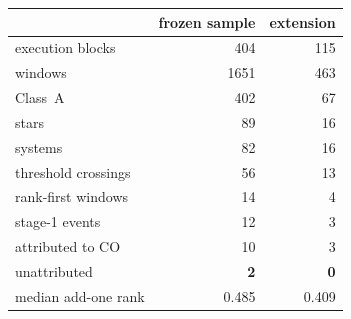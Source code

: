 \begin{tabular}{@{}lrr@{}}
\toprule
 & frozen sample & extension \\
\midrule
execution blocks & 404 & 115 \\
windows & 1651 & 463 \\
\quad Class~A & 402 & 67 \\
stars & 89 & 16 \\
systems & 82 & 16 \\
\midrule
threshold crossings & 56 & 13 \\
rank-first windows & 14 & 4 \\
stage-1 events & 12 & 3 \\
\quad attributed to CO & 10 & 3 \\
\quad unattributed & \textbf{2} & \textbf{0} \\
\midrule
median add-one rank & 0.485 & 0.409 \\
\bottomrule
\end{tabular}
